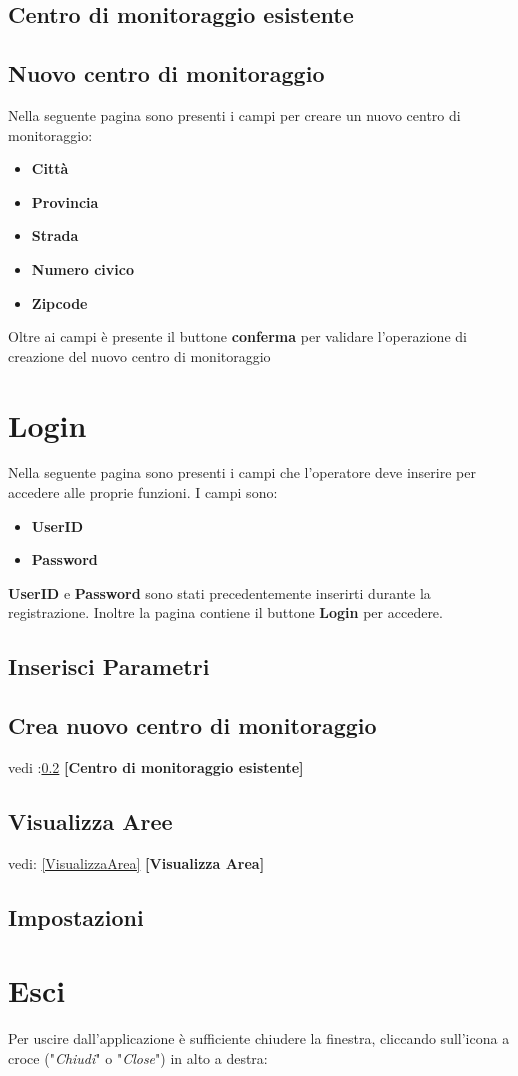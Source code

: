 \subsection{Centro di monitoraggio esistente}
\subsection{Nuovo centro di monitoraggio} \label{NuovoCentroDiMonitoraggio}
Nella seguente pagina sono presenti i campi per creare un nuovo centro di monitoraggio:
\begin{itemize}
	\item \textbf{Città}
	\item \textbf{Provincia}
	\item \textbf{Strada}
	\item \textbf{Numero civico}
	\item \textbf{Zipcode}
\end{itemize}
Oltre ai campi è presente il buttone \textbf{conferma} per validare l'operazione di creazione del nuovo centro di monitoraggio
\section{Login}
Nella seguente pagina sono presenti i campi che l'operatore deve inserire per accedere alle proprie funzioni. I campi sono:
\begin{itemize}
	\item \textbf{UserID} 
	\item \textbf{Password}
\end{itemize} 
\textbf{UserID} e \textbf{Password} sono stati precedentemente inserirti durante la registrazione.
Inoltre la pagina contiene il buttone \textbf{Login} per accedere.
\subsection{Inserisci Parametri}

\subsection{Crea nuovo centro di monitoraggio}
vedi :\ref{NuovoCentroDiMonitoraggio} 	\textbf{[Centro di monitoraggio esistente]}
\subsection{Visualizza Aree}
vedi: \ref{VisualizzaArea} 	\textbf{[Visualizza Area]}
\subsection{Impostazioni}

\section{Esci}
Per uscire dall'applicazione è sufficiente chiudere la finestra, cliccando sull'icona a croce ("\textit{Chiudi}" o "\textit{Close}") in alto a destra:


\nocite{IuriTex}


